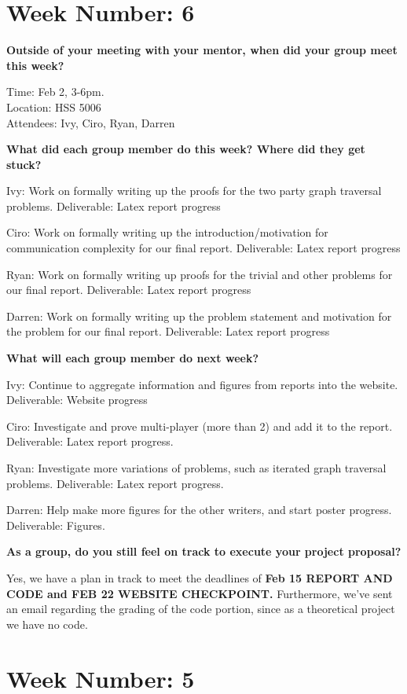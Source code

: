\section{\texorpdfstring{\textbf{Week Number:
6}}{Week Number: 6}}\label{week-number-6}

\textbf{Outside of your meeting with your mentor, when did your group
meet this week?}

Time: Feb 2, 3-6pm.\\
Location: HSS 5006\\
Attendees: Ivy, Ciro, Ryan, Darren

\textbf{What did each group member do this week? Where did they get
stuck?}

Ivy: Work on formally writing up the proofs for the two party graph
traversal problems. Deliverable: Latex report progress

Ciro: Work on formally writing up the introduction/motivation for
communication complexity for our final report. Deliverable: Latex report
progress

Ryan: Work on formally writing up proofs for the trivial and other
problems for our final report. Deliverable: Latex report progress

Darren: Work on formally writing up the problem statement and motivation
for the problem for our final report. Deliverable: Latex report progress

\textbf{What will each group member do next week?}

Ivy: Continue to aggregate information and figures from reports into the
website. Deliverable: Website progress

Ciro: Investigate and prove multi-player (more than 2) and add it to the
report. Deliverable: Latex report progress.

Ryan: Investigate more variations of problems, such as iterated graph
traversal problems. Deliverable: Latex report progress.

Darren: Help make more figures for the other writers, and start poster
progress. Deliverable: Figures.

\textbf{As a group, do you still feel on track to execute your project
proposal?}

Yes, we have a plan in track to meet the deadlines of \textbf{Feb 15
REPORT AND CODE and FEB 22 WEBSITE CHECKPOINT.} Furthermore, we've sent
an email regarding the grading of the code portion, since as a
theoretical project we have no code.

\section{\texorpdfstring{\textbf{Week Number:
5}}{Week Number: 5}}\label{week-number-5}

